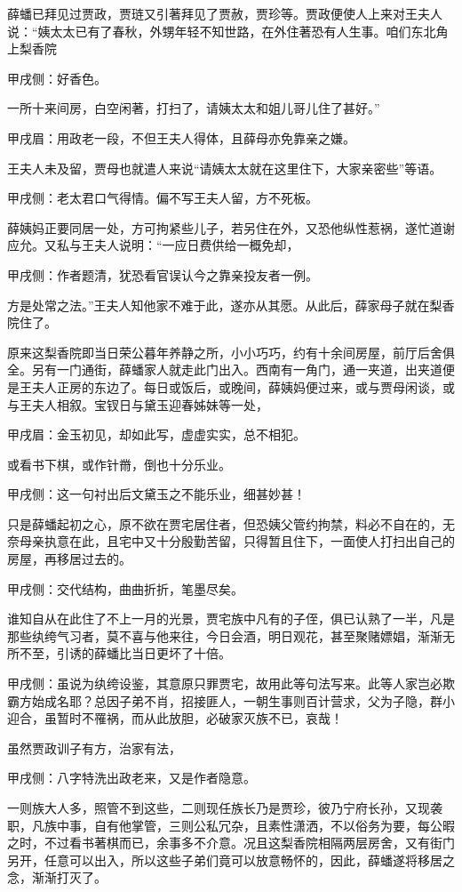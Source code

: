 \begin{parag}
    薛蟠已拜见过贾政，贾琏又引著拜见了贾赦，贾珍等。贾政便使人上来对王夫人说：“姨太太已有了春秋，外甥年轻不知世路，在外住著恐有人生事。咱们东北角上梨香院\begin{note}甲戌侧：好香色。\end{note}一所十来间房，白空闲著，打扫了，请姨太太和姐儿哥儿住了甚好。”\begin{note}甲戌眉：用政老一段，不但王夫人得体，且薛母亦免靠亲之嫌。\end{note}王夫人未及留，贾母也就遣人来说“请姨太太就在这里住下，大家亲密些”等语。\begin{note}甲戌侧：老太君口气得情。偏不写王夫人留，方不死板。\end{note}薛姨妈正要同居一处，方可拘紧些儿子，若另住在外，又恐他纵性惹祸，遂忙道谢应允。又私与王夫人说明：“一应日费供给一概免却，\begin{note}甲戌侧：作者题清，犹恐看官误认今之靠亲投友者一例。\end{note}方是处常之法。”王夫人知他家不难于此，遂亦从其愿。从此后，薛家母子就在梨香院住了。
\end{parag}


\begin{parag}
    原来这梨香院即当日荣公暮年养静之所，小小巧巧，约有十余间房屋，前厅后舍俱全。另有一门通街，薛蟠家人就走此门出入。西南有一角门，通一夹道，出夹道便是王夫人正房的东边了。每日或饭后，或晚间，薛姨妈便过来，或与贾母闲谈，或与王夫人相叙。宝钗日与黛玉迎春姊妹等一处，\begin{note}甲戌眉：金玉初见，却如此写，虚虚实实，总不相犯。\end{note}或看书下棋，或作针黹，倒也十分乐业。\begin{note}甲戌侧：这一句衬出后文黛玉之不能乐业，细甚妙甚！\end{note}只是薛蟠起初之心，原不欲在贾宅居住者，但恐姨父管约拘禁，料必不自在的，无奈母亲执意在此，且宅中又十分殷勤苦留，只得暂且住下，一面使人打扫出自己的房屋，再移居过去的。\begin{note}甲戌侧：交代结构，曲曲折折，笔墨尽矣。\end{note}谁知自从在此住了不上一月的光景，贾宅族中凡有的子侄，俱已认熟了一半，凡是那些纨绔气习者，莫不喜与他来往，今日会酒，明日观花，甚至聚赌嫖娼，渐渐无所不至，引诱的薛蟠比当日更坏了十倍。\begin{note}甲戌侧：虽说为纨绔设鉴，其意原只罪贾宅，故用此等句法写来。此等人家岂必欺霸方始成名耶？总因子弟不肖，招接匪人，一朝生事则百计营求，父为子隐，群小迎合，虽暂时不罹祸，而从此放胆，必破家灭族不已，哀哉！\end{note}虽然贾政训子有方，治家有法，\begin{note}甲戌侧：八字特洗出政老来，又是作者隐意。\end{note}一则族大人多，照管不到这些，二则现任族长乃是贾珍，彼乃宁府长孙，又现袭职，凡族中事，自有他掌管，三则公私冗杂，且素性潇洒，不以俗务为要，每公暇之时，不过看书著棋而已，余事多不介意。况且这梨香院相隔两层房舍，又有街门另开，任意可以出入，所以这些子弟们竟可以放意畅怀的，因此，薛蟠遂将移居之念，渐渐打灭了。
\end{parag}


